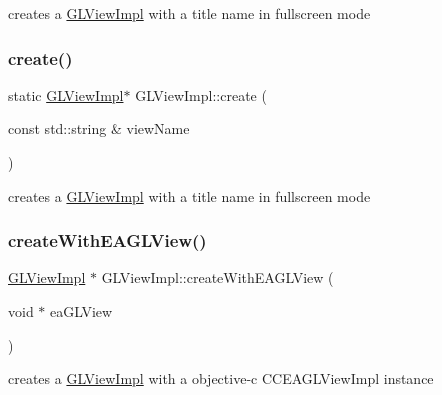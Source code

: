 creates a \hyperlink{classGLViewImpl}{G\+L\+View\+Impl} with a title name in fullscreen mode \mbox{\label{classGLViewImpl_a6e699d7e719e91833b93dcfffca4d081}} 
\subsubsection{\texorpdfstring{create()}{create()}\hspace{0.1cm}{\footnotesize\ttfamily [2/2]}}
{\footnotesize\ttfamily static \hyperlink{classGLViewImpl}{G\+L\+View\+Impl}$\ast$ G\+L\+View\+Impl\+::create (\begin{DoxyParamCaption}\item[{const std\+::string \&}]{view\+Name }\end{DoxyParamCaption})\hspace{0.3cm}{\ttfamily [static]}}

creates a \hyperlink{classGLViewImpl}{G\+L\+View\+Impl} with a title name in fullscreen mode \mbox{\label{classGLViewImpl_af7e035bc07cb084d6111cb2b77827142}} 
\subsubsection{\texorpdfstring{create\+With\+E\+A\+G\+L\+View()}{createWithEAGLView()}\hspace{0.1cm}{\footnotesize\ttfamily [1/2]}}
{\footnotesize\ttfamily \hyperlink{classGLViewImpl}{G\+L\+View\+Impl} $\ast$ G\+L\+View\+Impl\+::create\+With\+E\+A\+G\+L\+View (\begin{DoxyParamCaption}\item[{void $\ast$}]{ea\+G\+L\+View }\end{DoxyParamCaption})\hspace{0.3cm}{\ttfamily [static]}}

creates a \hyperlink{classGLViewImpl}{G\+L\+View\+Impl} with a objective-\/c C\+C\+E\+A\+G\+L\+View\+Impl instance \mbox{\label{classGLViewImpl_a70c82427d999c13359a1e24b9ce38f11}} 

